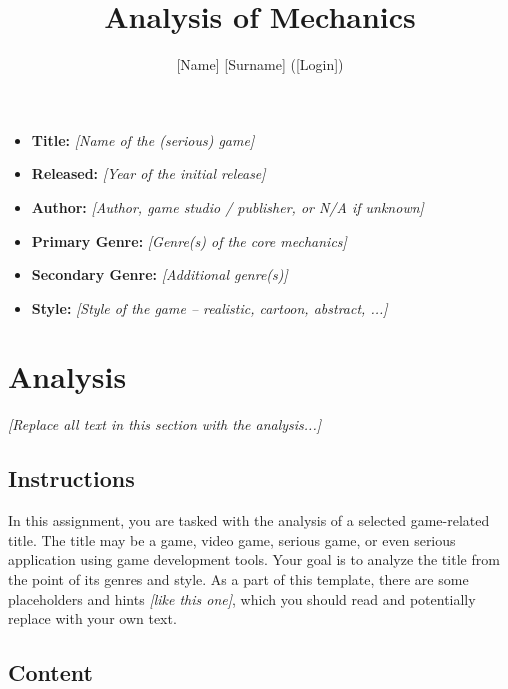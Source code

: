 \documentclass[a4paper,10pt,english]{article}
\title{%
Analysis of Mechanics%
}
\author{%
[Name] [Surname] ([Login])%
}
\date{}
\newcommand{\ph}[1]{\textit{[#1]}}
\begin{document}
\maketitle
\thispagestyle{empty}

{%
\large

\begin{itemize}

\item[] \textbf{Title:} \ph{Name of the (serious) game}

\item[] \textbf{Released:} \ph{Year of the initial release}

\item[] \textbf{Author:} \ph{Author, game studio / publisher, or N/A if unknown}

\item[] \textbf{Primary Genre:} \ph{Genre(s) of the core mechanics}

\item[] \textbf{Secondary Genre:} \ph{Additional genre(s)}

\item[] \textbf{Style:} \ph{Style of the game -- realistic, cartoon, abstract, ...}

\end{itemize}

}

\section*{\centering Analysis}

\ph{Replace all text in this section with the analysis...}

\subsection*{Instructions}

In this assignment, you are tasked with the analysis of a selected game-related title. The title may be a game, video game, serious game, or even serious application using game development tools. Your goal is to analyze the title from the point of its genres and style. As a part of this template, there are some placeholders and hints \ph{like this one}, which you should read and potentially replace with your own text.

\subsection*{Content}
\end{document}
